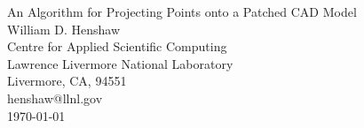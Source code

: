 \documentclass[11pt]{article}
\begin{document}


\newcommand{\mapping}{/home/henshaw/Overture/mapping}
\newcommand{\figures}{./}

\vspace{3\baselineskip}
\begin{center}
  {\Large 
   An Algorithm for Projecting Points onto a Patched CAD Model \\
  }
\vspace{ 2\baselineskip}
William D. Henshaw  \\
Centre for Applied Scientific Computing \\
Lawrence Livermore National Laboratory    \\
Livermore, CA, 94551   \\
henshaw@llnl.gov \\
\vspace{1\baselineskip}
\today \\
\vspace{\baselineskip}

\end{center}

\vspace{1\baselineskip}
\end{document}
